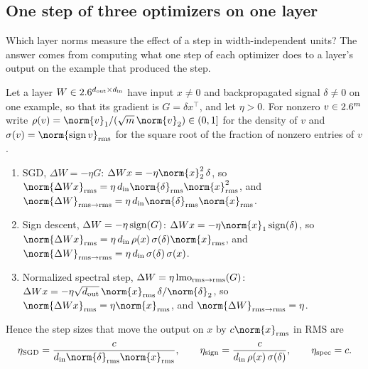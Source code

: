 \begin{refsection}
\subsection{One step of three optimizers on one layer}

Which layer norms measure the effect of a step in width-independent units? The answer comes from computing what one step of each optimizer does to a layer's output on the example that produced the step.

\begin{theorem}\label{thm:modular:widthrules}
Let a layer $W\in2.6^{d_{\mathrm{out}}\times d_{\mathrm{in}}}$ have input $x\ne0$ and backpropagated signal $\delta\ne0$ on one example, so that its gradient is $G=\delta x^\top$, and let $\eta>0$. For nonzero $v\in2.6^m$ write $\rho(v)=\norm{v}_1/(\sqrt m\,\norm{v}_2)\in(0,1]$ for the density of $v$ and $\sigma(v)=\norm{\sign v}_\rms$ for the square root of the fraction of nonzero entries of $v$.
\begin{enumerate}
\item SGD, $\Delta W=-\eta G$: $\Delta Wx=-\eta\norm{x}_2^2\,\delta$, so $\norm{\Delta Wx}_\rms=\eta\,\modularin\norm{\delta}_\rms\norm{x}_\rms^2$, and $\norm{\Delta W}_{\rms\to\rms}=\eta\,\modularin\norm{\delta}_\rms\norm{x}_\rms$.
\item Sign descent, $\Delta W=-\eta\operatorname{sign}(G)$: $\Delta Wx=-\eta\norm{x}_1\sign(\delta)$, so $\norm{\Delta Wx}_\rms=\eta\,\modularin\,\rho(x)\,\sigma(\delta)\norm{x}_\rms$, and $\norm{\Delta W}_{\rms\to\rms}=\eta\,\modularin\,\sigma(\delta)\,\sigma(x)$.
\item Normalized spectral step, $\Delta W=\eta\operatorname{lmo}_{\mathrm{rms}\to\mathrm{rms}}(G)$: $\Delta Wx=-\eta\sqrt{\modularout}\,\norm{x}_\rms\,\delta/\norm{\delta}_2$, so $\norm{\Delta Wx}_\rms=\eta\norm{x}_\rms$, and $\norm{\Delta W}_{\rms\to\rms}=\eta$.
\end{enumerate}
Hence the step sizes that move the output on $x$ by $c\norm{x}_\rms$ in RMS are
\begin{equation}\label{eq:modular:rules}
  \eta_{\mathrm{SGD}}=\frac{c}{\modularin\norm{\delta}_\rms\norm{x}_\rms},\qquad
  \eta_{\mathrm{sign}}=\frac{c}{\modularin\,\rho(x)\,\sigma(\delta)},\qquad
  \eta_{\mathrm{spec}}=c .
\end{equation}
\end{theorem}


\end{refsection}
